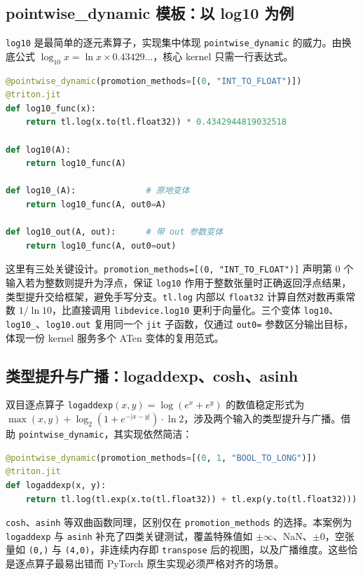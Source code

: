 \subsection{pointwise\_dynamic 模板：以 log10 为例}
\texttt{log10} 是最简单的逐元素算子，实现集中体现 \texttt{pointwise\_dynamic} 的威力。由换底公式 $\log_{10} x = \ln x \times 0.43429\ldots$，核心 kernel 只需一行表达式。

\begin{lstlisting}[language=Python, caption={log10 算子的 pointwise\_dynamic 实现（code/ops/log10.py）}, label={code:log10}]
@pointwise_dynamic(promotion_methods=[(0, "INT_TO_FLOAT")])
@triton.jit
def log10_func(x):
    return tl.log(x.to(tl.float32)) * 0.4342944819032518

def log10(A):
    return log10_func(A)

def log10_(A):              # 原地变体
    return log10_func(A, out0=A)

def log10_out(A, out):      # 带 out 参数变体
    return log10_func(A, out0=out)
\end{lstlisting}

这里有三处关键设计。\texttt{promotion\_methods=[(0, "INT\_TO\_FLOAT")]} 声明第 0 个输入若为整数则提升为浮点，保证 \texttt{log10} 作用于整数张量时正确返回浮点结果，类型提升交给框架，避免手写分支。\texttt{tl.log} 内部以 \texttt{float32} 计算自然对数再乘常数 $1/\ln 10$，比直接调用 \texttt{libdevice.log10} 更利于向量化。三个变体 \texttt{log10}、\texttt{log10\_}、\texttt{log10.out} 复用同一个 \texttt{jit} 子函数，仅通过 \texttt{out0=} 参数区分输出目标，体现一份 kernel 服务多个 ATen 变体的复用范式。

\subsection{类型提升与广播：logaddexp、cosh、asinh}
双目逐点算子 \texttt{logaddexp}$(x,y) = \log(e^x + e^y)$ 的数值稳定形式为 $\max(x,y) + \log_2(1 + e^{-|x-y|}) \cdot \ln 2$，涉及两个输入的类型提升与广播。借助 \texttt{pointwise\_dynamic}，其实现依然简洁：
\begin{lstlisting}[language=Python]
@pointwise_dynamic(promotion_methods=[(0, 1, "BOOL_TO_LONG")])
@triton.jit
def logaddexp(x, y):
    return tl.log(tl.exp(x.to(tl.float32)) + tl.exp(y.to(tl.float32)))
\end{lstlisting}
\texttt{cosh}、\texttt{asinh} 等双曲函数同理，区别仅在 \texttt{promotion\_methods} 的选择。本案例为 \texttt{logaddexp} 与 \texttt{asinh} 补充了四类关键测试，覆盖特殊值如 $\pm\infty$、NaN、$\pm 0$，空张量如 \texttt{(0,)} 与 \texttt{(4,0)}，非连续内存即 \texttt{transpose} 后的视图，以及广播维度。这些恰是逐点算子最易出错而 PyTorch 原生实现必须严格对齐的场景。

